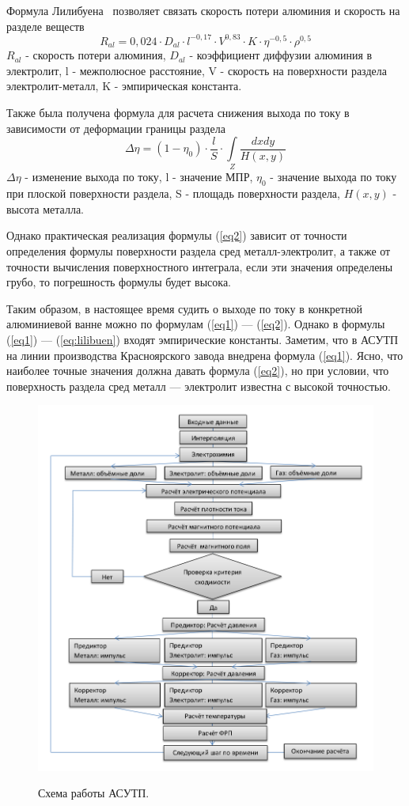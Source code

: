 \documentclass{article}
\begin{document}
Формула Лилибуена~\cite{litlink:Lillebuen} позволяет связать скорость потери алюминия и скорость на разделе веществ
\begin{equation}\label{eq:lilibuen}
R_{al} = 0,024 \cdot D_{al} \cdot l^{-0,17} \cdot V^{0,83} \cdot K \cdot \eta^{-0,5} \cdot \rho^{0,5}
\end{equation}
$R_{al}$ - скорость потери алюминия, $D_{al}$ - коэффициент диффузии алюминия в электролит, l - межполюсное расстояние, V - скорость на поверхности раздела электролит-металл, K - эмпирическая константа.

Также была получена формула для расчета снижения выхода по току в зависимости от деформации границы раздела~\cite{litlink:derkach2}
\begin{equation} \label{eq2}
\Delta \eta = (1- \eta_0) \cdot \frac{l}{S} \cdot \int\limits_Z \frac{dxdy}{H(x,y)}
\end{equation}
$\Delta \eta$ - изменение выхода по току, l - значение МПР, $\eta_0$ - значение выхода по току при плоской поверхности раздела, S - площадь  поверхности раздела, $H(x,y)$ - высота металла.

Однако практическая реализация формулы (\ref{eq2}) зависит от точности определения формулы поверхности раздела сред металл-электролит, а также от точности вычисления поверхностного интеграла, если эти значения определены грубо, то погрешность формулы будет высока.

Таким образом, в настоящее время судить о выходе по току в конкретной алюминиевой ванне можно по формулам (\ref{eq1}) — (\ref{eq2}). Однако в формулы (\ref{eq1}) — (\ref{eq:lilibuen}) входят эмпирические константы. Заметим, что в АСУТП на линии производства Красноярского завода внедрена формула (\ref{eq1}). Ясно, что наиболее точные значения должна давать формула (\ref{eq2}), но при условии, что поверхность раздела сред металл — электролит известна с высокой точностью.

\begin{figure}[H]
\centering
\includegraphics[width=0.8\linewidth]{scheme.png}
\caption[]{}
\label{fig:ASUTPscheme}
Схема работы АСУТП.
\end{figure}
\end{document}
